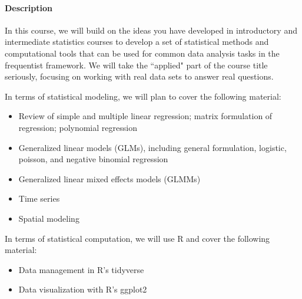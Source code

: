 \documentclass[11pt]{article}
\begin{document}
\paragraph{Description}

In this course, we will build on the ideas you have developed in introductory and intermediate statistics courses to develop a set of statistical methods and computational tools that can be used for common data analysis tasks in the frequentist framework.  We will take the ``applied" part of the course title seriously, focusing on working with real data sets to answer real questions.  

In terms of statistical modeling, we will plan to cover the following material:
\begin{itemize}
  \item Review of simple and multiple linear regression; matrix formulation of regression; polynomial regression
  \item Generalized linear models (GLMs), including general formulation, logistic, poisson, and negative binomial regression
  \item Generalized linear mixed effects models (GLMMs)
\item Time series
\item Spatial modeling
\end{itemize}

In terms of statistical computation, we will use R and cover the following material:
\begin{itemize}
  \item Data management in R's tidyverse
  \item Data visualization with R's ggplot2
\end{itemize}
\end{document}
